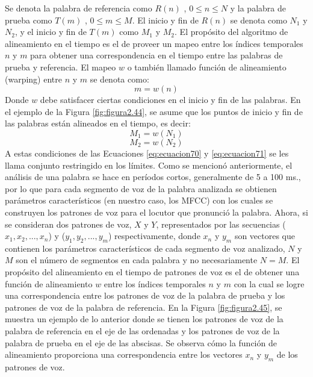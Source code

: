 \begin{enumerate}
Se denota la palabra de referencia como $R(n)$ , $0 \leq n \leq N$ y la palabra de prueba como $T(m)$ , $0 \leq m \leq M$. El inicio y fin de $R(n)$ se denota como $N_{1}$ y $N_{2}$, y el inicio y fin de $T(m)$ como $M_{1}$ y $M_{2}$. El propósito del algoritmo de alineamiento en el tiempo es el de proveer un mapeo entre los índices temporales $n$ y $m$ para obtener una correspondencia en el tiempo entre las palabras de prueba y referencia. El mapeo $w$ o también llamado función de alineamiento (warping) entre $n$ y $m$ se denota como:
\begin{equation}
\label{eq:ecuacion69}
m = w(n)
\end{equation}
Donde $w$ debe satisfacer ciertas condiciones en el inicio y fin de las palabras. En el ejemplo de la Figura \ref{fig:figura2.44}, se asume que los puntos de inicio y fin de las palabras están alineados en el tiempo, es decir:
\begin{equation}
\label{eq:ecuacion70}
M_{1} = w(N_{1})
\end{equation}
\begin{equation}
\label{eq:ecuacion71}
M_{2} = w(N_{2})
\end{equation}
A estas condiciones de las Ecuaciones \eqref{eq:ecuacion70} y \eqref{eq:ecuacion71} se les llama conjunto restringido en los límites. Como se mencionó anteriormente, el análisis de una palabra se hace en períodos cortos, generalmente de 5 a 100 ms., por lo que para cada segmento de voz de la palabra analizada se obtienen parámetros característicos (en nuestro caso, los MFCC) con los cuales se construyen los patrones de voz para el locutor que pronunció la palabra.
\vskip 0.5cm
Ahora, si se consideran dos patrones de voz, $X$ y $Y$, representados por las secuencias ($x_{1}, x_{2},..., x_{n}$) y ($y_{1}, y_{2},..., y_{m}$) respectivamente, donde $x_{n}$ y $y_{m}$ son vectores que contienen los parámetros característicos de cada segmento de voz analizado, $N$ y $M$ son el número de segmentos en cada palabra y no necesariamente $N = M$. 
\vskip 0.5cm
El propósito del alineamiento en el tiempo de patrones de voz es el de obtener una función de alineamiento $w$ entre los índices temporales $n$ y $m$ con la cual se logre una correspondencia entre los patrones de voz de la palabra de prueba y los patrones de voz de la palabra de referencia. En la Figura \ref{fig:figura2.45}, se muestra un ejemplo de lo anterior donde se tienen los patrones de voz de la palabra de referencia en el eje de las ordenadas y los patrones de voz de la palabra de prueba en el eje de las abscisas. Se observa cómo la función de alineamiento proporciona una correspondencia entre los vectores $x_{n}$ y $y_{m}$ de los patrones de voz.

\end{enumerate}
